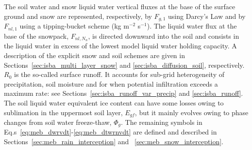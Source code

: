 The soil water and snow liquid water vertical fluxes at the base of
the surface ground and snow are represented,
respectively,
by $F_{g,1}$ using Darcy's Law and by $F_{nl,1}$ using a
tipping-bucket scheme (kg m$^{-2}$ s$^{-1}$). 
The liquid water flux at the base of the snowpack, $F_{nl,N_n}$, is
directed downward into the soil and consists in the liquid water in
excess of the lowest model liquid water holding capacity.
%
A description of the
explicit snow and soil schemes are given in 
Sections~\ref{sec:isba_multi_layer_snow} 
and \ref{sec:isba_diffusion_soil}, respectively.
%
%
%
%
%
$R_0$ is the so-called surface runoff. It accounts for sub-grid
heterogeneity of precipitation, soil moisture and for when 
potential infiltration exceeds a maximum
rate: see Sections~\ref{sec:isba_runoff_var_precip} and \ref{sec:isba_runoff}.
%
The soil liquid water equivalent ice content can have some losses
owing to sublimation in the uppermost soil layer, $E_{gf}$, but it mainly
evolves owing to phase changes from soil water freeze-thaw, $\Phi_{g}$.
%
%
%
%
%
%
%
The remaining symbols in Eq.s~\ref{eq:meb_dwrvdt}-\ref{eq:meb_dtwrnvdt}
are defined and described in Sections~\ref{sec:meb_rain_interception} and
~\ref{sec:meb_snow_interception}.


